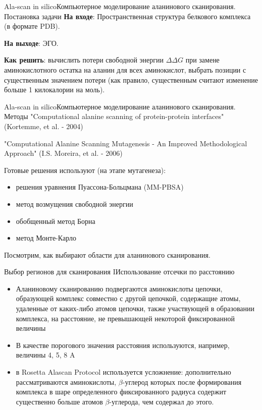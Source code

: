 \documentclass[12pt, xcolor={dvipsnames}]{beamer}
\begin{document}
\begin{frame}{Ala-scan in silico}{Компьютерное моделирование аланинового сканирования. Постановка задачи}
\textbf{На входе}: Пространственная структура белкового комплекса (в формате PDB).

\textbf{На выходе}: ЭГО.

\textbf{Как решить}: 
вычислить потери свободной энергии $\Delta\Delta G$ при замене аминокислотного остатка на аланин для всех аминокислот, выбрать позиции с существенным значением потери (как правило, существенным считают изменение больше 1 килокалории на моль).
\end{frame}

\begin{frame}{Ala-scan in silico}{Компьютерное моделирование аланинового сканирования. Методы}
"Computational alanine scanning of protein-protein interfaces" (Kortemme, et al. - 2004)

"Computational Alanine Scanning Mutagenesis - An Improved Methodological Approach" (I.S. Moreira, et al. - 2006)

Готовые решения используют (на этапе мутагенеза): 
\begin{itemize}
\item решения уравнения Пуассона-Больцмана (MM-PBSA)
\item метод возмущения свободной энергии
\item обобщенный метод Борна
\item метод Монте-Карло
\end{itemize}
Посмотрим, как выбирают области для аланинового сканирования.
\end{frame}
\begin{frame}{Выбор регионов для сканирования I}{Использование отсечки по расстоянию}
\begin{itemize}
\item Аланиновому сканированию подвергаются аминокислоты цепочки, образующей комплекс совместно с другой цепочкой, содержащие атомы, удаленные от каких-либо атомов цепочки, также участвующей в образовании комплекса, на расстояние, не превышающей некоторой фиксированной величины

\item В качестве порогового значения расстояния используются, например, величины 4, 5, 8 A

\item в Rosetta Alascan Protocol используется усложнение: дополнительно рассматриваются аминокислоты, $\beta$-углерод которых после формирования комплекса в шаре определенного фиксированного радиуса содержит существенно больше атомов $\beta$-углерода, чем содержал до этого.
\end{itemize}
\end{frame}
\end{document}
